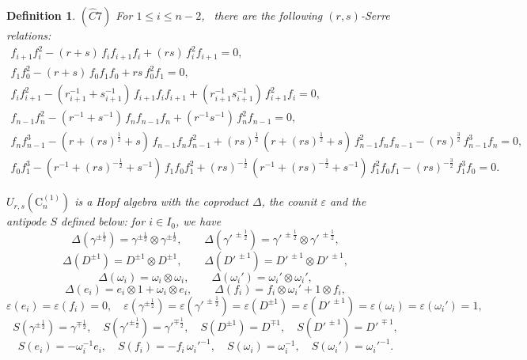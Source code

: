 \documentclass{amsproc}
\newtheorem{defi}[theo]{Definition}
\theoremstyle{remark}
\numberwithin{equation}{section}
\begin{document}
\begin{defi}
{ $(\hat{C}7)$ \textit{For} $1\leqslant i\leqslant n-2$, \textit{~there are the following }
$(r,s)$-Serre \textit{relations:}
\begin{gather*}
f_{i+1}f_i^2-(r{+}s)\,f_if_{i+1}f_i+(rs)\,f_i^2f_{i+1}=0,\\
f_{1}f_0^2-(r{+}s)\,f_0f_{1}f_0+rs\,f_0^2f_{1}=0,\\
f_if_{i+1}^2-(r_{i+1}^{-1}{+}s_{i+1}^{-1})\,f_{i+1}f_if_{i+1}+
(r_{i+1}^{-1}s_{i+1}^{-1})\,f_{i+1}^2f_i=0,\\
f_{n-1}f_n^2-(r^{-1}{+}s^{-1})\,f_nf_{n-1}f_n+(r^{-1}s^{-1})\,f_n^2f_{n-1}=0,\\
f_nf_{n-1}^3-(r{+}(rs)^{\frac{1}{2}}{+}s)\,f_{n-1}f_nf_{n-1}^2+(rs)^{\frac{1}{2}}\,
(r{+}(rs)^{\frac{1}{2}}{+}s)\,f_{n-1}^2f_nf_{n-1}-
(rs)^{\frac{3}{2}}\,f_{n-1}^3f_n=0,\\
f_0f_{1}^3-(r^{-1}{+}(rs)^{-\frac{1}{2}}{+}s^{-1})\,f_{1}f_0f_{1}^2+
(rs)^{-\frac{1}{2}}\,
(r^{-1}{+}(rs)^{-\frac{1}{2}}{+}s^{-1})\,f_{1}^2f_0f_{1}-
(rs)^{-\frac{3}{2}}\,f_{1}^3f_0=0.
\end{gather*}}

 $U_{r,s}(\mathrm{C}_n^{(1)})$ is a Hopf algebra with the coproduct
$\Delta$, the counit ${\varepsilon}$ and the antipode $S$ defined below: for
$i\in I_0$, we have
$$\Delta(\gamma^{\pm\frac{1}2})=\gamma^{\pm\frac{1}2}\otimes
\gamma^{\pm\frac{1}2}, \qquad
\Delta(\gamma'^{\,\pm\frac{1}2})=\gamma'^{\,\pm\frac{1}2}\otimes
\gamma'^{\,\pm\frac{1}2},$$
$$\Delta(D^{\pm1})=D^{\pm1}\otimes
D^{\pm1},\qquad \Delta(D'^{\,\pm1})=D'^{\,\pm1}\otimes
D'^{\,\pm1},$$
$$\Delta({\omega}_i)={\omega}_i{\otimes} {\omega}_i, \qquad
\Delta({\omega}_i')={\omega}_i'{\otimes} {\omega}_i',$$
$$\Delta(e_i)=e_i{\otimes} 1+{\omega}_i{\otimes} e_i, \qquad \Delta(f_i)=f_i{\otimes} {\omega}_i'+1{\otimes} f_i, $$
$${\varepsilon}(e_i)={\varepsilon}(f_i)=0,\quad {\varepsilon}(\gamma^{\pm\frac{1}2})
={\varepsilon}(\gamma'^{\,\pm\frac{1}2})={\varepsilon}(D^{\pm1})={\varepsilon}(D'^{\,\pm1})={\varepsilon}({\omega}_i)={\varepsilon}({\omega}_i')=1,
$$
$$S(\gamma^{\pm\frac{1}2})=\gamma^{\mp\frac{1}2},\quad S(\gamma'^{\pm\frac{1}2})=\gamma'^{\mp\frac{1}2},\quad
S(D^{\pm1})=D^{\mp1},\quad S(D'^{\,\pm1})=D'^{\,\mp1},$$
$$S(e_i)=-{\omega}_i^{-1}e_i,\quad
S(f_i)=-f_i\,{\omega}_i'^{-1},\quad S({\omega}_i)={\omega}_i^{-1}, \quad
S({\omega}_i')={\omega}_i'^{-1}.$$
\end{defi}
\end{document}
